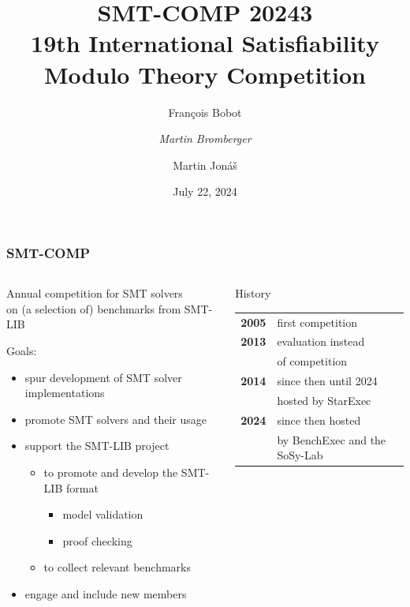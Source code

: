 \documentclass[table]{beamer}
\title{SMT-COMP 20243\\
19th International Satisfiability Modulo Theory Competition}
\author{Fran\c{c}ois Bobot \and \emph{Martin Bromberger} \and Martin Jon\'{a}\v{s} }
\date{July 22, 2024}
\institute{
CEA List, France \and
MPI für Informatik, Germany \and
Masaryk University, Czechia
}
\def\emph#1{\textcolor{MYblue}{#1}}
\begin{document}
\begin{frame}
  \titlepage
\end{frame}


\begin{frame}
  \frametitle{SMT-COMP}
  
  \begin{columns}
    \begin{column}{0.6\textwidth}
    Annual competition for \emph{SMT solvers}\\
    on (a selection of) benchmarks from \emph{SMT-LIB}
      
    \bigskip
    \bigskip    
    
    Goals:
    \begin{itemize}
      \item spur development of SMT solver implementations
      \item promote SMT solvers and their usage
      \item support the SMT-LIB project
      \begin{itemize}
        \item to promote and develop the SMT-LIB format
        \begin{itemize}
          \item model validation
          \item proof checking
        \end{itemize}
        \item to collect relevant benchmarks
      \end{itemize}
      \item engage and include new members
    \end{itemize}
    \end{column}
    \begin{column}{0.4\textwidth}
    \begin{block}{History}
      \begin{tabular}{rp{3cm}}
        \textbf{2005} & first competition \\
        \textbf{2013} & evaluation instead \\
        & of competition\\
        \textbf{2014} & since then until 2024\\
        & hosted by \emph{StarExec}\\
        \textbf{2024} & since then hosted\\
        & by \emph{BenchExec} and the \emph{SoSy-Lab} 
      \end{tabular}
    \end{block}
    \end{column}
  \end{columns}

\end{frame}
\end{document}
